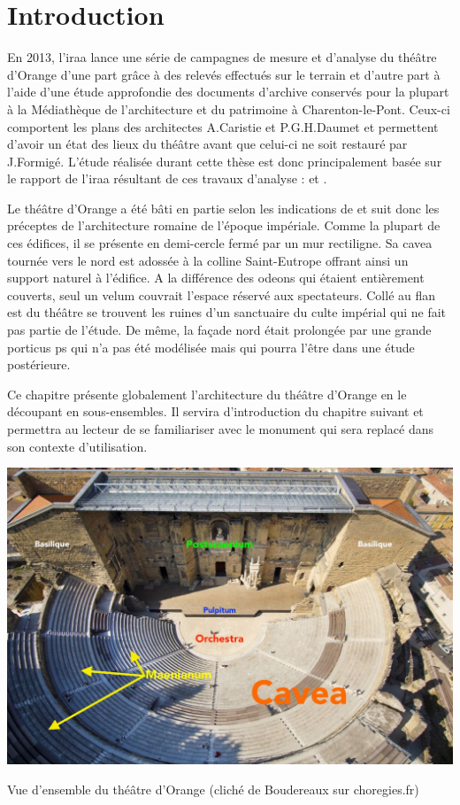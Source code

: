 		\section{Introduction}
		
		En 2013, l'\gls{iraa} lance une série de campagnes de mesure et d'analyse du théâtre d'Orange d'une part grâce à des relevés effectués sur le terrain et d'autre part à l'aide d'une étude approfondie des documents d'archive conservés pour la plupart à la Médiathèque de l'architecture et du patrimoine à Charenton-le-Pont. Ceux-ci comportent les plans des architectes A.Caristie et P.G.H.Daumet et permettent d'avoir un état des lieux du théâtre avant que celui-ci ne soit restauré par J.Formigé. L'étude réalisée durant cette thèse est donc principalement basée sur le rapport de l'\gls{iraa} résultant de ces travaux d'analyse : \cite{orangeTxt} et \citep{orangePl}.
		
		Le théâtre d'Orange a été bâti en partie selon les indications de \cite{vitruve} et suit donc les préceptes de l'architecture romaine de l'époque impériale. Comme la plupart de ces édifices, il se présente en demi-cercle fermé par un mur rectiligne. Sa \gls{cavea} tournée vers le nord est adossée à la colline Saint-Eutrope offrant ainsi un support naturel à l'édifice. A la différence des \glspl{odeon} qui étaient entièrement couverts, seul un \gls{velum} couvrait l'espace réservé aux spectateurs. Collé au flan est du théâtre se trouvent les ruines d'un sanctuaire du culte impérial qui ne fait pas partie de l'étude. De même, la façade nord était prolongée par une grande \gls{porticus ps} qui n'a pas été modélisée mais qui pourra l'être dans une étude postérieure. 
		
		Ce chapitre présente globalement l'architecture du théâtre d'Orange en le découpant en sous-ensembles. Il servira d'introduction du chapitre suivant et permettra au lecteur de se familiariser avec le monument qui sera replacé dans son contexte d'utilisation.

	\begin{figureth}
			\includegraphics[width=\linewidth]{images/vuensemble}
			\caption[Vue d'ensemble du théâtre d'Orange]{Vue d'ensemble du théâtre d'Orange (cliché de Boudereaux sur choregies.fr)}
	\end{figureth}


